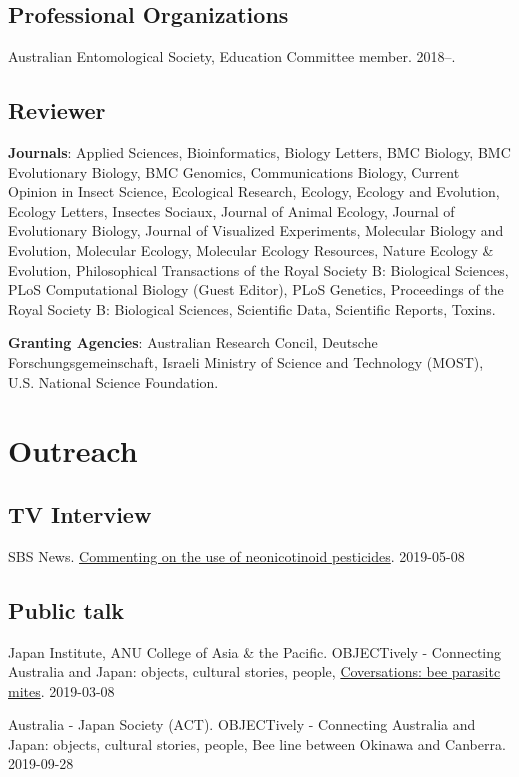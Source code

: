 \documentclass[11pt]{article}
\begin{document}
\subsection{Professional Organizations}
\ind Australian Entomological Society, Education Committee
member. 2018--.

\subsection{Reviewer}
\ind \textbf{Journals}: Applied Sciences, Bioinformatics, Biology
Letters, BMC Biology, BMC Evolutionary Biology, BMC Genomics,
Communications Biology, Current Opinion in Insect Science, Ecological
Research, Ecology, Ecology and Evolution, Ecology Letters, Insectes
Sociaux, Journal of Animal Ecology, Journal of Evolutionary Biology,
Journal of Visualized Experiments, Molecular Biology and Evolution,
Molecular Ecology, Molecular Ecology Resources, Nature Ecology \&
Evolution, Philosophical Transactions of the Royal Society B: Biological
Sciences, PLoS Computational Biology (Guest Editor), PLoS Genetics,
Proceedings of the Royal Society B: Biological Sciences, Scientific
Data, Scientific Reports, Toxins. 

\ind \textbf{Granting Agencies}: Australian Research Concil, Deutsche
Forschungsgemeinschaft, Israeli Ministry of Science and Technology
(MOST), U.S. National Science Foundation. 


\section{Outreach}

\subsection{TV Interview}
\ind SBS
News.  \href{https://www.sbs.com.au/news/australian-beekeepers-call-for-ban-on-potentially-harmful-pesticide}{Commenting
on the use of neonicotinoid pesticides}. 2019-05-08

\subsection{Public talk}
\ind Japan Institute, ANU College of Asia \& the Pacific. OBJECTively -
Connecting Australia and Japan: objects, cultural stories,
people, \href{http://japaninstitute.anu.edu.au/events/objectively-connecting-australia-and-japan-objects-cultural-stories-people}{Coversations:
bee parasitc mites}. 2019-03-08

\ind Australia - Japan Society (ACT). OBJECTively - Connecting Australia
and Japan: objects, cultural stories, people, Bee line between Okinawa
and Canberra. 2019-09-28
\end{document}

